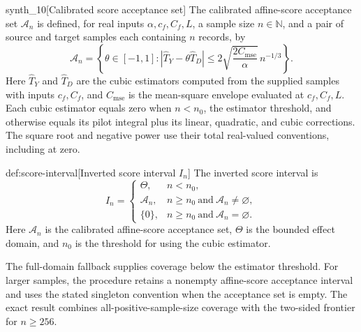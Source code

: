 \documentclass[11pt]{article}
\begin{document}
\begin{definitionv}{synth_10}[Calibrated score acceptance set]
The calibrated affine-score acceptance set \(\mathcal A_n\) is defined, for real inputs \(\alpha,c_f,C_f,L\), a sample size \(n\in\mathbb N\), and a pair of source and target samples each containing \(n\) records, by
\[
\mathcal A_n
=
\left\{
\theta\in[-1,1]:
\left|\widehat T_Y-\theta\widehat T_D\right|
\le
2\sqrt{\frac{2C_{\mathrm{mse}}}{\alpha}}\,
n^{-1/3}
\right\}.
\]
Here \(\widehat T_Y\) and \(\widehat T_D\) are the cubic estimators computed from the supplied samples with inputs \(c_f,C_f\), and \(C_{\mathrm{mse}}\) is the mean-square envelope evaluated at \(c_f,C_f,L\). Each cubic estimator equals zero when \(n<n_0\), the estimator threshold, and otherwise equals its pilot integral plus its linear, quadratic, and cubic corrections. The square root and negative power use their total real-valued conventions, including at zero.
\end{definitionv}

\begin{definitionv}{def:score-interval}[Inverted score interval \(I_n\)]
The inverted score interval is
\[
I_n=
\begin{cases}
\Theta,& n<n_0,\\
\mathcal A_n,& n\ge n_0\ \text{and}\ \mathcal A_n\ne\varnothing,\\
\{0\},& n\ge n_0\ \text{and}\ \mathcal A_n=\varnothing.
\end{cases}
\]
Here \(\mathcal A_n\) is the calibrated affine-score acceptance set, \(\Theta\) is the bounded effect domain, and \(n_0\) is the threshold for using the cubic estimator.
\end{definitionv}

The full-domain fallback supplies coverage below the estimator threshold. For larger samples, the procedure retains a nonempty affine-score acceptance interval and uses the stated singleton convention when the acceptance set is empty. The exact result combines all-positive-sample-size coverage with the two-sided frontier for \(n\ge256\).
\end{document}
